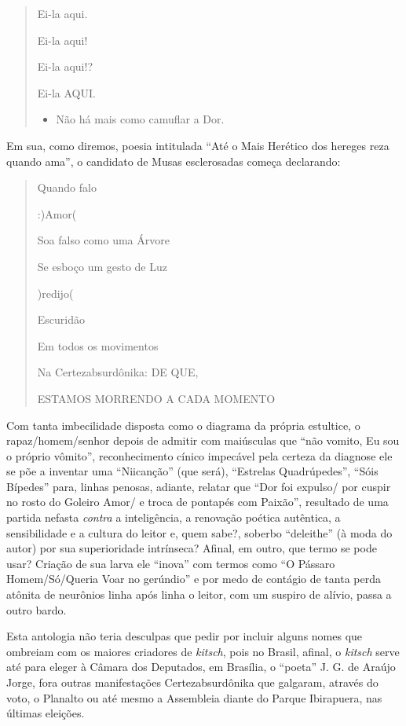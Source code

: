 \documentclass[
  letterpaper,
  DIV=11,
  numbers=noendperiod]{scrreprt}
\providecommand{\tightlist}{%
  \setlength{\itemsep}{0pt}\setlength{\parskip}{0pt}}\usepackage{longtable,booktabs,array}
\begin{document}
\begin{quote}
Ei-la aqui.~

Ei-la aqui!~

Ei-la aqui!?~

Ei-la AQUI.~

\begin{itemize}
\tightlist
\item
  Não há mais como camuflar a Dor.
\end{itemize}
\end{quote}

Em sua, como diremos, poesia intitulada ``Até o Mais Herético dos
hereges reza quando ama'', o candidato de Musas esclerosadas começa
declarando:

\begin{quote}
Quando falo~

:)Amor(~

Soa falso como uma Árvore~

Se esboço um gesto de Luz~

)redijo(~

Escuridão~

Em todos os movimentos~

Na Certezabsurdônika: DE QUE,~

ESTAMOS MORRENDO A CADA MOMENTO
\end{quote}

Com tanta imbecilidade disposta como o diagrama da própria estultice, o
rapaz/homem/senhor depois de admitir com maiúsculas que ``não vomito, Eu
sou o próprio vômito'', reconhecimento cínico impecável pela certeza da
diagnose ele se põe a inventar uma ``Niicanção'' (que será), ``Estrelas
Quadrúpedes'', ``Sóis Bípedes'' para, linhas penosas, adiante, relatar
que ``Dor foi expulso/ por cuspir no rosto do Goleiro Amor/ e troca de
pontapés com Paixão'', resultado de uma partida nefasta \emph{contra} a
inteligência, a renovação poética autêntica, a sensibilidade e a cultura
do leitor e, quem sabe?, soberbo ``deleithe'' (à moda do autor) por sua
superioridade intrínseca? Afinal, em outro, que termo se pode usar?
Criação de sua larva ele ``inova'' com termos como ``O Pássaro
Homem/Só/Queria Voar no gerúndio'' e por medo de contágio de tanta perda
atônita de neurônios linha após linha o leitor, com um suspiro de
alívio, passa a outro bardo.

Esta antologia não teria desculpas que pedir por incluir alguns nomes
que ombreiam com os maiores criadores de \emph{kitsch}, pois no Brasil,
afinal, o \emph{kitsch} serve até para eleger à Câmara dos Deputados, em
Brasília, o ``poeta'' J. G. de Araújo Jorge, fora outras manifestações
Certezabsurdônika que galgaram, através do voto, o Planalto ou até mesmo
a Assembleia diante do Parque Ibirapuera, nas últimas eleições.
\end{document}
